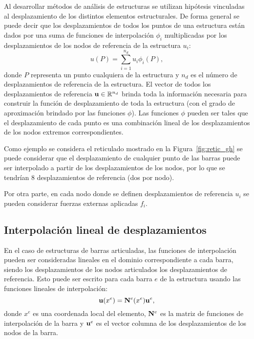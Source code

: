 Al desarrollar métodos de análisis de estructuras se utilizan hipótesis vinculadas al desplazamiento de los distintos elementos estructurales. %
De forma general se puede decir que los desplazamientos de todos los puntos de una estructura están dados por una suma de funciones de interpolación $\phi_i$ multiplicadas por los desplazamientos de los nodos de referencia de la estructura $u_i$:
%
\begin{equation}
u(P) = \sum_{i=1}^{n_d} u_i \phi_i(P),
\end{equation}
%
donde $P$ representa un punto cualquiera de la estructura y $n_d$ es el número de desplazamientos de referencia de la estructura. %
%
El vector de todos los desplazamientos de referencia ${\bf u} \in {\mathbb R}^{n_d}$ brinda toda la información necesaria para construir la función de desplazamiento de toda la estructura (con el grado de aproximación brindado por las funciones $\phi$). %
%
Las funciones $\phi$ pueden ser tales que el desplazamiento de cada punto es una combinación lineal de los desplazamientos de los nodos extremos correspondientes.

Como ejemplo se considera el reticulado mostrado en la Figura~\ref{fig:retic_gh} se puede considerar que el desplazamiento de cualquier punto de las barras puede ser interpolado a partir de los desplazamientos de los nodos, por lo que se tendrían $8$ desplazamientos de referencia (dos por nodo).

Por otra parte, en cada nodo donde se definen desplazamientos de referencia $u_i$ se pueden considerar fuerzas externas aplicadas $f_i$.

\subsection{Interpolación lineal de desplazamientos}

En el caso de estructuras de barras articuladas, las funciones de interpolación pueden ser consideradas lineales en el dominio correspondiente a cada barra, siendo los desplazamientos de los nodos articulados los desplazamientos de referencia. %
%
Esto puede ser escrito para cada barra $e$ de la estructura usando las funciones lineales de interpolación:
%
\begin{equation}
{\bf u} (x^e) = {\bf N}^e(x^e) {\bf u}^e,
\end{equation}
%
donde $x^e$ es una coordenada local del elemento, ${\bf N}^e$ es la matriz de funciones de interpolación de la barra y ${\bf u}^e$ es el vector columna de los desplazamientos de los nodos de la barra. %
%


